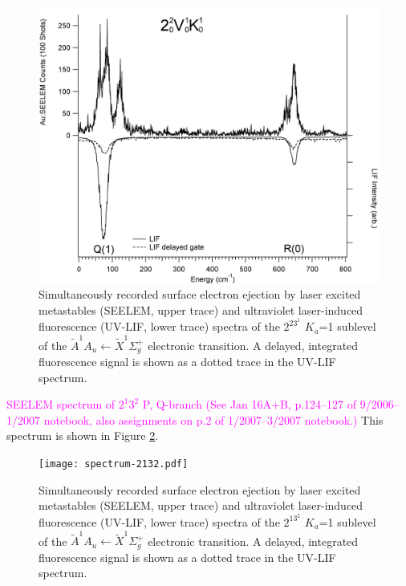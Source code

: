 \documentclass[12pt,draft]{mitthesis}
\newcommand{\POINT}[1]{\textcolor{magenta}{#1}}
\begin{document}
\begin{figure}
  \caption{
    Simultaneously recorded surface electron ejection by laser excited
    metastables (SEELEM, upper trace) and ultraviolet laser-induced
    fluorescence (UV-LIF, lower trace) spectra of the $2^23^1$ $K_a$=1
    sublevel of the $\tilde{A}^1A_u \leftarrow \tilde{X} ^1\Sigma_g^+$
    electronic transition. A delayed, integrated fluorescence signal
    is shown as a dotted trace in the UV-LIF spectrum.}
  \label{fig:spectrum-2231-q1r0}
  \centering
  \includegraphics[width=6in]{spectrum-2231-Q1R0.png}
\end{figure}

\POINT{SEELEM spectrum of $2^1 3^2$ P, Q-branch (See Jan 16A+B,
  p.124--127 of 9/2006--1/2007 notebook, also assignments on p.2 of
  1/2007--3/2007 notebook.)}  This spectrum is shown in Figure
\ref{fig:spectrum-2132}.

\begin{figure}
  \caption{
    Simultaneously recorded surface electron ejection by laser excited
    metastables (SEELEM, upper trace) and ultraviolet laser-induced
    fluorescence (UV-LIF, lower trace) spectra of the $2^13^2$ $K_a$=1
    sublevel of the $\tilde{A}^1A_u \leftarrow \tilde{X} ^1\Sigma_g^+$
    electronic transition. A delayed, integrated fluorescence signal
    is shown as a dotted trace in the UV-LIF spectrum.}
  \label{fig:spectrum-2132}
  \centering
  \texttt{[image: spectrum-2132.pdf]}
\end{figure}
\end{document}
